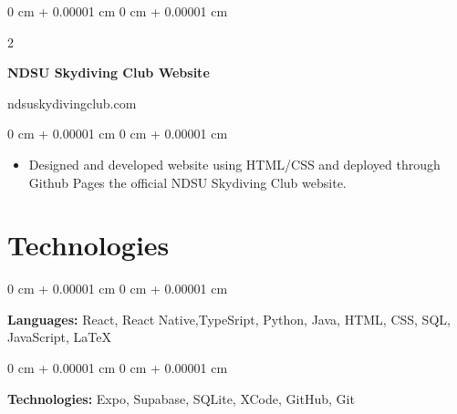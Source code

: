 \documentclass[10pt, letterpaper]{article}
\newenvironment{highlights}{
    \begin{itemize}[
        topsep=0.10 cm,
        parsep=0.10 cm,
        partopsep=0pt,
        itemsep=0pt,
        leftmargin=0 cm + 20pt
    ]
}{
    \end{itemize}
} %
\newenvironment{onecolentry}{
    \begin{adjustwidth}{
        0 cm + 0.00001 cm
    }{
        0 cm + 0.00001 cm
    }
}{
    \end{adjustwidth}
} %
\newenvironment{twocolentry}[2][]{
    \onecolentry
    \def\secondColumn{#2}
    \setcolumnwidth{\fill, 4.5 cm}
    \begin{paracol}{2}
}{
    \switchcolumn \raggedleft \secondColumn
    \end{paracol}
    \endonecolentry
} %
\begin{document}
    \vspace{0.2 cm}

    \begin{twocolentry}{
        ndsuskydivingclub.com
    }
        \textbf{NDSU Skydiving Club Website}
    \end{twocolentry}

    \vspace{0.10 cm}
    \begin{onecolentry}
        \begin{highlights}
            \item Designed and developed website using HTML/CSS and deployed through Github Pages the official NDSU Skydiving Club website.
        \end{highlights}
    \end{onecolentry}

    \section{Technologies}

    \begin{onecolentry}
        \textbf{Languages:} React, React Native,TypeSript, Python, Java, HTML, CSS, SQL, JavaScript, LaTeX
    \end{onecolentry}

    \vspace{0.2 cm}

    \begin{onecolentry}
        \textbf{Technologies:} Expo, Supabase, SQLite, XCode, GitHub, Git
    \end{onecolentry}
\end{document}
